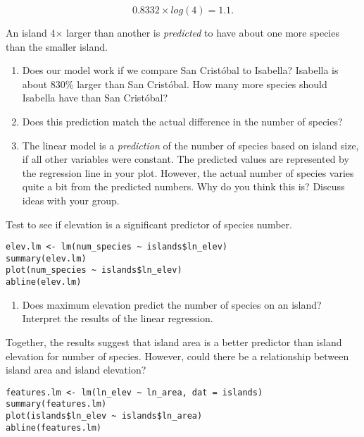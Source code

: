 \documentclass[11pt]{article}
\newcommand{\bigSpace}{\vspace{5\baselineskip}}
\begin{document}
 \[ 0.8332 \times log(4) = 1.1.\]
 
An island 4$\times$ larger than another is \emph{predicted} to have about one more species than the smaller island.
 
\begin{enumerate}[resume]
\item Does our model work if we compare San Cristóbal to Isabella? Isabella is about 830\% larger than San Cristóbal. How many more species should Isabella have than San Cristóbal?

\bigSpace
 
\item Does this prediction match the actual difference in the number of species? 
 
\bigSpace
 
\item The linear model is a \emph{prediction} of the number of species based on island size, if all other variables were constant. The predicted values are represented by the regression line in your plot.  However, the actual number of species varies quite a bit from the predicted numbers. Why do you think this is? Discuss ideas with your group.


\end{enumerate}
 
\newpage

Test to see if elevation is a significant predictor of species number.

\begin{verbatim}
elev.lm <- lm(num_species ~ islands$ln_elev)
summary(elev.lm)
plot(num_species ~ islands$ln_elev)
abline(elev.lm)
\end{verbatim}

\begin{enumerate}[resume]
\item Does maximum elevation predict the number of species on an island? Interpret the results of the linear regression. 

\bigSpace

\end{enumerate}

Together, the results suggest that island area is a better predictor than island elevation for number of species. However, could there be a relationship between island area and island elevation?

\begin{verbatim}
features.lm <- lm(ln_elev ~ ln_area, dat = islands)
summary(features.lm)
plot(islands$ln_elev ~ islands$ln_area)
abline(features.lm)
\end{verbatim}
\end{document}

